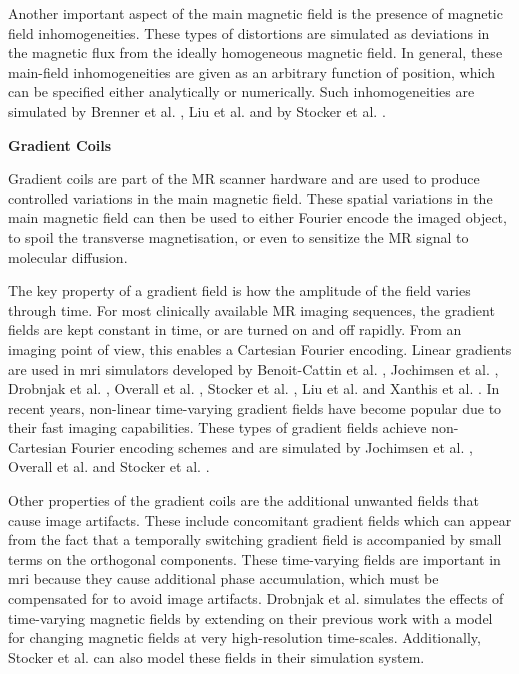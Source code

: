 \hfill

Another important aspect of the main magnetic field is the presence of magnetic field inhomogeneities.
These types of distortions are simulated as deviations in the magnetic flux from the ideally homogeneous magnetic field.
In general, these main-field inhomogeneities are given as an arbitrary function of position, which can be specified either analytically or numerically.
Such inhomogeneities are simulated by 
Brenner et al. \cite{Brenner1997}, 
Liu et al. \cite{Liu2017} and by
Stocker et al. \cite{Stocker2010}.


\hfill

\large \textbf{Gradient Coils} \normalsize

Gradient coils are part of the MR scanner hardware and are used to produce controlled variations in the main magnetic field.
These spatial variations in the main magnetic field can then be used 
to either Fourier encode the imaged object, 
to spoil the transverse magnetisation, or even
to sensitize the MR signal to molecular diffusion.

\hfill
    
The key property of a gradient field is how the amplitude of the field varies through time.
For most clinically available MR imaging sequences, the gradient fields are kept constant in time, or are turned on and off rapidly.
From an imaging point of view, this enables a Cartesian Fourier encoding.
Linear gradients are used in \ac{mri} simulators developed by
Benoit-Cattin et al. \cite{Benoit-Cattin2005},
Jochimsen et al. \cite{Jochimsen2004},
Drobnjak et al. \cite{Drobnjak2006},
Overall et al. \cite{Overall2007},
Stocker et al. \cite{Stocker2010},
Liu et al. \cite{Liu2013} and 
Xanthis et al. \cite{Xanthis2014}.
In recent years, non-linear time-varying gradient fields have become popular due to their fast imaging capabilities.
These types of gradient fields achieve non-Cartesian Fourier encoding schemes and are simulated by 
Jochimsen et al. \cite{Jochimsen2004}, 
Overall et al. \cite{Overall2007} and
Stocker et al. \cite{Stocker2010}.

\hfill

Other properties of the gradient coils are the additional unwanted fields that cause image artifacts.
These include concomitant gradient fields which can appear from the fact that a temporally switching gradient field is accompanied by small terms on the orthogonal components.
These time-varying fields are important in \ac{mri} because they cause additional phase accumulation, which must be compensated for to avoid image artifacts.
Drobnjak et al. \cite{Drobnjak2010} simulates the effects of time-varying magnetic fields by extending on their previous work \cite{Drobnjak2006} with a model for changing magnetic fields at very high-resolution time-scales.
Additionally, Stocker et al. \cite{Stocker2010} can also model these fields in their simulation system.

